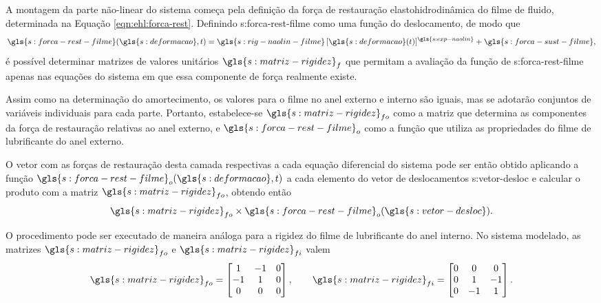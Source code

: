 \documentclass[12pt,oneside,english,brazil,lmodern,siglas,simbolos,cite=num]{ucsmonograph}
\begin{document}
	A montagem da parte não-linear do sistema começa pela definição da força de restauração elastohidrodinâmica do filme de fluido, determinada na Equação \ref{eqn:ehl:forca-rest}.
	Definindo \gls{s:forca-rest-filme} como uma função do deslocamento, de modo que
	\begin{equation*}
		\gls{s:forca-rest-filme}(\gls{s:deformacao},t) =
		\gls{s:rig-naolin-filme}\,[\gls{s:deformacao}(t)]^{
		\gls{s:exp-naolin}} + \gls{s:forca-sust-filme},
	\end{equation*}
	é possível determinar matrizes de valores unitários $\gls{s:matriz-rigidez}_f$ que permitam a avaliação da função de \gls{s:forca-rest-filme} apenas nas equações do sistema em que essa componente de força realmente existe.
	
	Assim como na determinação do amortecimento, os valores para o filme no anel externo e interno são iguais, mas se adotarão conjuntos de variáveis individuais para cada parte.
	Portanto, estabelece-se $\gls{s:matriz-rigidez}_{fo}$ como a matriz que determina as componentes da força de restauração relativas ao anel externo, e $\gls{s:forca-rest-filme}_o$ como a função que utiliza as propriedades do filme de lubrificante do anel externo.
	
	O vetor com as forças de restauração desta camada respectivas a cada equação diferencial do sistema pode ser então obtido aplicando a função $\gls{s:forca-rest-filme}_o(\gls{s:deformacao},t)$ a cada elemento do vetor de deslocamentos \gls{s:vetor-desloc} e calcular o produto com a matriz $\gls{s:matriz-rigidez}_{fo}$, obtendo então
	\begin{equation*}
		\gls{s:matriz-rigidez}_{fo}\times
		\gls{s:forca-rest-filme}_o(\gls{s:vetor-desloc}).
	\end{equation*}
	
	O procedimento pode ser executado de maneira análoga para a rigidez do filme de lubrificante do anel interno.
	No sistema modelado, as matrizes $\gls{s:matriz-rigidez}_{fo}$ e $\gls{s:matriz-rigidez}_{fi}$ valem
	\begin{equation*}
		\gls{s:matriz-rigidez}_{fo} =
		\begin{bmatrix}
		1	&	-1	&	0\\
		-1	&	1	&	0\\
		0	&	0	&	0\\
		\end{bmatrix},\qquad
		\gls{s:matriz-rigidez}_{fi} =
		\begin{bmatrix}
		0	&	0	&	0\\
		0	&	1	&	-1\\
		0	&	-1	&	1\\
		\end{bmatrix}.
	\end{equation*}
	
\end{document}
